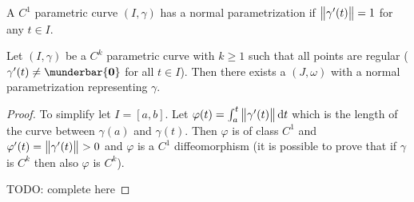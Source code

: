 \documentclass[14pt]{extarticle}
\renewcommand{\vec}[1]{\munderbar{\mathbf{#1}}}
\begin{document}
\begin{definition}
    A $C^1$ parametric curve $(I, \gamma)$ has a normal parametrization if $\norm{\gamma'(t)} = 1$ for any $t \in I$.
\end{definition}

\begin{proposition}
    Let $(I, \gamma)$ be a $C^k$ parametric curve with $k \geq 1$ such that all points are regular ($\gamma'(t) \neq \vec 0$ for all $t \in I$).
    Then there exists a $(J, \omega)$ with a normal parametrization representing $\gamma$.
\end{proposition}

\begin{proof}
    To simplify let $I = [a, b]$. Let $\varphi(t) = \int_a^t \norm{\gamma'(t)}\dd{t}$ which is the length of the curve between $\gamma(a)$ and $\gamma(t)$.
    Then $\varphi$ is of class $C^1$ and $\varphi'(t) = \norm{\gamma'(t)} > 0$ and $\varphi$ is a $C^1$ diffeomorphism (it is possible to prove that if $\gamma$ is $C^k$ then also $\varphi$ is $C^k$).

    TODO: complete here
\end{proof}
\end{document}
